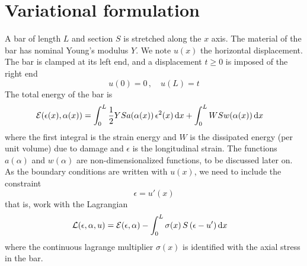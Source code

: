 \documentclass[]{article}
\renewcommand*\d{\mathop{}\!\mathrm{d}} %
\begin{document}






%
%
%
%
%
%
\section{Variational formulation} \label{sec:varia}
%
%
%
%
%
%
%
\newcommand{\load}{t}

A bar of length $L$ and section $S$ is stretched along the $x$ axis.
The material of the bar has nominal Young's modulus $Y$.
We note $u(x)$ the horizontal displacement.
The bar is clamped at its left end, and a displacement $\load \ge 0$ is imposed of the right end
\begin{equation}
\label{eq:bc}
u(0)=0 \, , \quad u(L)=\load
\end{equation}
 The total energy of the bar is 
\begin{align}
\label{eq:energy}
{\cal E}(\epsilon(x),\alpha(x)) & = \int_0^L \frac12 Y S a(\alpha(x)) \, \epsilon^2(x) \d x+ \int_0^L W S w(\alpha(x)) \d x 
\end{align}
where the first integral is the strain energy and $W$ is the dissipated energy (per unit volume) due to damage and $\epsilon$ is the longitudinal strain.
The functions  $a(\alpha)$ and $w(\alpha)$ are non-dimensionalized functions, to be discussed later on.
As the boundary conditions are written with $u(x)$, we need to include the constraint
\begin{equation}
\label{eq:strain_disp}
\epsilon = u'(x)
\end{equation}
that is, work with the Lagrangian
\begin{align}
\label{eq:lagrangian}
{\cal L}(\epsilon,\alpha,u) & = {\cal E}(\epsilon,\alpha) -  \int_0^L \sigma(x) \, S \,  (\epsilon-u') \d x 
\end{align}
where the continuous lagrange multiplier $\sigma(x)$ is identified with the axial stress in the bar.
\end{document}
